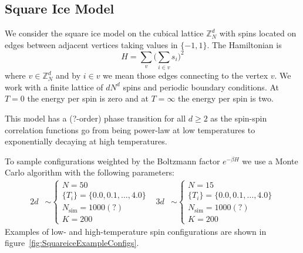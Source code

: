 \documentclass[11pt]{article}
\begin{document}
\newpage
\subsection{Square Ice Model}
We consider the square ice model on the cubical lattice $\mathbb{Z}_N^d$ with spins located on edges between adjacent vertices taking values in $\{{-1},1\}$. The Hamiltonian is
\begin{equation}
    H = \sum_v\Big(\sum_{i\in v}s_i\Big)^2
\end{equation}
where $v\in\mathbb{Z}_N^d$ and by $i\in v$ we mean those edges connecting to the vertex $v$. We work with a finite lattice of $dN^d$ spins and periodic boundary conditions. At $T=0$ the energy per spin is zero and at $T=\infty$ the energy per spin is two.

This model has a (?-order) phase transition for all $d\geq 2$ as the spin-spin correlation functions go from being power-law at low temperatures to exponentially decaying at high temperatures.

To sample configurations weighted by the Boltzmann factor $e^{-\beta H}$ we use a Monte Carlo algorithm with the following parameters:
\begin{align}
    2d&\sim\left\{\begin{array}{l}
        N = 50\\
        \{T_i\} = \{0.0,0.1,\ldots,4.0\}\\
        N_\text{sim} = 1000(?)\\
        K = 200
    \end{array}\right. & 3d&\sim\left\{\begin{array}{l}
        N = 15\\
        \{T_i\} = \{0.0,0.1,\ldots,4.0\}\\
        N_\text{sim} = 1000(?)\\
        K = 200
    \end{array}\right.
\end{align}
Examples of low- and high-temperature spin configurations are shown in figure~\ref{fig:SquareiceExampleConfigs}.
\end{document}
